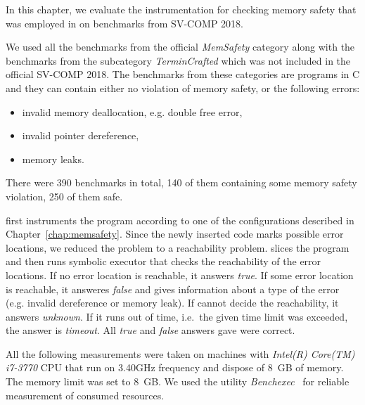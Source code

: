 In this chapter, we evaluate the instrumentation for checking memory safety
that was employed in \symbiotic on benchmarks from SV-COMP 2018.

We used all the benchmarks from the official \emph{MemSafety} category along
with the benchmarks from the subcategory \emph{TerminCrafted} which was not
included in the official SV-COMP 2018. The benchmarks from these categories are
programs in C and they can contain either no violation of memory safety, or the
following errors:
\begin{itemize}
  \item invalid memory deallocation, e.g. double free error,
  \item invalid pointer dereference,
  \item memory leaks.
\end{itemize}
There were 390 benchmarks in total, 140 of them containing some
memory safety violation, 250 of them safe.


\symbiotic first instruments the program according to one of the configurations
described in Chapter~\ref{chap:memsafety}. Since the newly inserted code marks
possible error locations, we reduced the problem to a reachability problem.
\symbiotic slices the program and then runs symbolic executor \klee that checks
the reachability of the error locations. If no error location is reachable, it
answers \emph{true}. If some error location is reachable, it answeres
\emph{false} and gives information about a type of the error (e.g.  invalid
dereference or memory leak). If \symbiotic cannot decide the reachability, it
answers \emph{unknown}. If it runs out of time, i.e.~the given time limit
was exceeded, the answer is \emph{timeout}. All \emph{true} and \emph{false}
answers \symbiotic gave were correct.

All the following measurements were taken on machines with \textit{Intel(R)
Core(TM) i7-3770} CPU that run on 3.40GHz frequency and dispose of 8~GB of
memory. The memory limit was set to 8~GB. We used the utility
\emph{Benchexec}~\cite{Beyer2015} for reliable measurement of consumed
resources.

